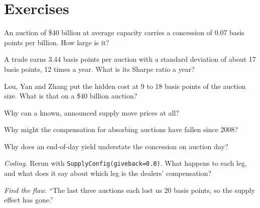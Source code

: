 \section{Exercises}

\begin{exercise}[$\star$]\label{exo:s2:supply-trades:1}
An auction of \$40 billion at average capacity carries a concession of 0.07 basis points per billion. How large is it?
\end{exercise}

\begin{exercise}[$\star$]\label{exo:s2:supply-trades:2}
A trade earns 3.44 basis points per auction with a standard deviation of about 17 basis points, 12 times a year. What is its Sharpe ratio a year?
\end{exercise}

\begin{exercise}[$\star$]\label{exo:s2:supply-trades:3}
Lou, Yan and Zhang put the hidden cost at 9 to 18 basis points of the auction size. What is that on a \$40 billion auction?
\end{exercise}

\begin{exercise}[$\star\star$]\label{exo:s2:supply-trades:4}
Why can a known, announced supply move prices at all?
\end{exercise}

\begin{exercise}[$\star\star$]\label{exo:s2:supply-trades:5}
Why might the compensation for absorbing auctions have fallen since 2008?
\end{exercise}

\begin{exercise}[$\star\star$]\label{exo:s2:supply-trades:6}
Why does an end-of-day yield understate the concession on auction day?
\end{exercise}

\begin{exercise}[$\star\star\star$]\label{exo:s2:supply-trades:7}
\emph{Coding.} Rerun with \texttt{SupplyConfig(giveback=0.0)}. What happens to each leg, and what does it say about which leg is the dealers'
compensation?
\end{exercise}

\begin{exercise}[$\star\star\star$]\label{exo:s2:supply-trades:8}
\emph{Find the flaw.} ``The last three auctions each lost us 20 basis points, so the supply effect has gone.''
\end{exercise}

